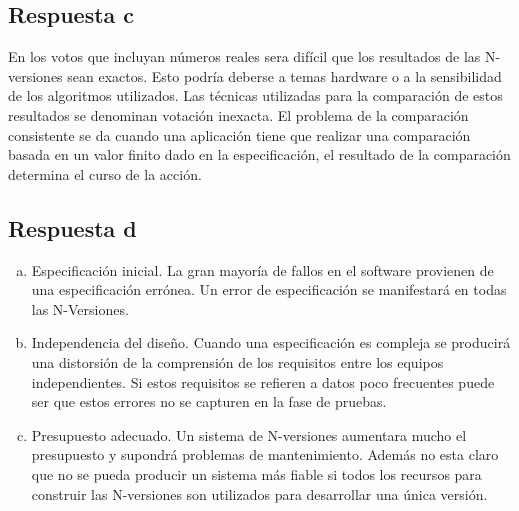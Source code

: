 \documentclass[a4paper,10pt]{article}
\begin{document}
\subsection{Respuesta c}

En los votos que incluyan números reales sera difícil que los resultados de las
N-versiones sean exactos. Esto podría deberse a temas hardware o a la
sensibilidad de los algoritmos utilizados. Las técnicas utilizadas para la
comparación de estos resultados se denominan votación inexacta. El problema de
la comparación consistente se da cuando una aplicación tiene que realizar una
comparación basada en un valor finito dado en la especificación, el resultado de
la comparación determina el curso de la acción.

\subsection{Respuesta d}

\begin{enumerate}[a)]
	\item Especificación inicial. La gran mayoría de fallos en el software
		provienen de una especificación errónea. Un error de
		especificación se manifestará en todas las N-Versiones.
	\item Independencia del diseño. Cuando una especificación es compleja se
		producirá una distorsión de la comprensión de los requisitos
		entre los equipos independientes. Si estos requisitos se
		refieren a datos poco frecuentes puede ser que estos errores no
		se capturen en la fase de pruebas.
	\item Presupuesto adecuado. Un sistema de N-versiones aumentara mucho el
		presupuesto y supondrá problemas de mantenimiento. Además no
		esta claro que no se pueda producir un sistema más fiable si
		todos los recursos para construir las N-versiones son utilizados
		para desarrollar una única versión.
\end{enumerate}
\end{document}

